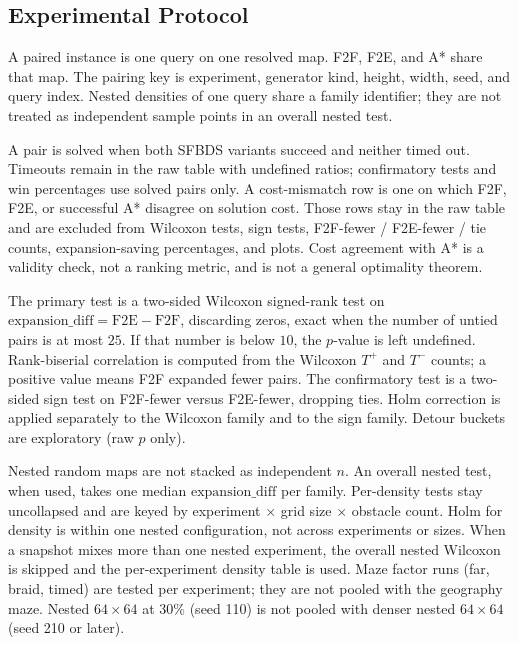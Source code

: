 \subsection{Experimental Protocol}

A paired instance is one query on one resolved map. F2F, F2E, and A* share that map. The pairing key is experiment, generator kind, height, width, seed, and query index. Nested densities of one query share a family identifier; they are not treated as independent sample points in an overall nested test.

A pair is solved when both SFBDS variants succeed and neither timed out. Timeouts remain in the raw table with undefined ratios; confirmatory tests and win percentages use solved pairs only. A cost-mismatch row is one on which F2F, F2E, or successful A* disagree on solution cost. Those rows stay in the raw table and are excluded from Wilcoxon tests, sign tests, F2F-fewer / F2E-fewer / tie counts, expansion-saving percentages, and plots. Cost agreement with A* is a validity check, not a ranking metric, and is not a general optimality theorem.

The primary test is a two-sided Wilcoxon signed-rank test on \(\mathrm{expansion\_diff}=\mathrm{F2E}-\mathrm{F2F}\), discarding zeros, exact when the number of untied pairs is at most \(25\). If that number is below \(10\), the \(p\)-value is left undefined. Rank-biserial correlation is computed from the Wilcoxon \(T^+\) and \(T^-\) counts; a positive value means F2F expanded fewer pairs. The confirmatory test is a two-sided sign test on F2F-fewer versus F2E-fewer, dropping ties. Holm correction is applied separately to the Wilcoxon family and to the sign family. Detour buckets are exploratory (raw \(p\) only).

Nested random maps are not stacked as independent \(n\). An overall nested test, when used, takes one median \(\mathrm{expansion\_diff}\) per family. Per-density tests stay uncollapsed and are keyed by experiment \(\times\) grid size \(\times\) obstacle count. Holm for density is within one nested configuration, not across experiments or sizes. When a snapshot mixes more than one nested experiment, the overall nested Wilcoxon is skipped and the per-experiment density table is used. Maze factor runs (far, braid, timed) are tested per experiment; they are not pooled with the geography maze. Nested \(64\times 64\) at \(30\%\) (seed 110) is not pooled with denser nested \(64\times 64\) (seed 210 or later).

